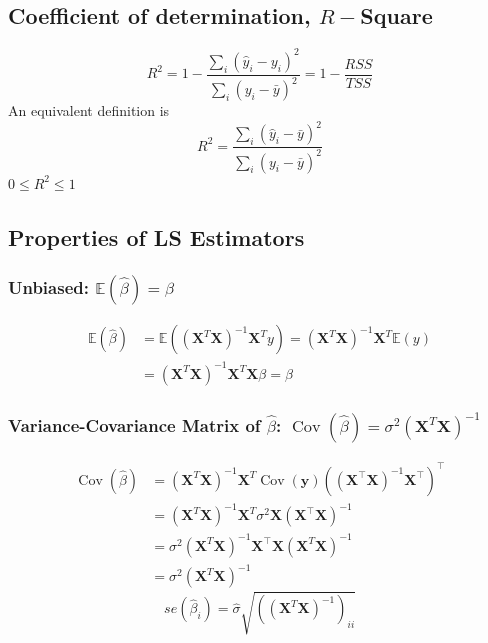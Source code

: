 \documentclass[11pt,a4paper]{article}
\begin{document}
\subsection{Coeﬃcient of determination, $R-$Square}
$$
R^{2}=1-\frac{\sum_{i}\left(\hat{y}_{i}-y_{i}\right)^{2}}{\sum_{i}\left(y_{i}-\bar{y}\right)^{2}}=1-\frac{R S S}{T S S}
$$
An equivalent definition is
$$
R^{2}=\frac{\sum_{i}\left(\hat{y}_{i}-\bar{y}\right)^{2}}{\sum_{i}\left(y_{i}-\bar{y}\right)^{2}}
$$
$0 \leq R^{2} \leq 1$

\subsection{Properties of LS Estimators}
\subsubsection{Unbiased: $\mathbb{E}(\hat{\beta})=\beta$}
\begin{equation}
    \begin{aligned}
        \mathbb{E}(\hat{\beta})&=\mathbb{E}(\left(\mathbf{X}^{T} \mathbf{X}\right)^{-1} \mathbf{X}^{T} y)=\left(\mathbf{X}^{T} \mathbf{X}\right)^{-1} \mathbf{X}^{T} \mathbb{E}(y)\\
        &=\left(\mathbf{X}^{T} \mathbf{X}\right)^{-1} \mathbf{X}^{T}\mathbf{X}\beta=\beta
    \end{aligned}
    \nonumber
\end{equation}

\subsubsection{Variance-Covariance Matrix of $\hat{\beta}$: $\operatorname{Cov}(\hat{\beta})=\sigma^{2}\left(\mathbf{X}^{T} \mathbf{X}\right)^{-1}$}
$$\begin{aligned} \operatorname{Cov}(\hat{\beta}) &=\left(\mathbf{X}^{T} \mathbf{X}\right)^{-1} \mathbf{X}^{T} \operatorname{Cov}(\mathbf{y})\left(\left(\mathbf{X}^{\top} \mathbf{X}\right)^{-1} \mathbf{X}^{\top}\right)^{\top} \\ &=\left(\mathbf{X}^{T} \mathbf{X}\right)^{-1} \mathbf{X}^{T} \sigma^{2} \mathbf{X}\left(\mathbf{X}^{\top} \mathbf{X}\right)^{-1} \\ &=\sigma^{2}\left(\mathbf{X}^{T} \mathbf{X}\right)^{-1} \mathbf{X}^{\top} \mathbf{X}\left(\mathbf{X}^{T} \mathbf{X}\right)^{-1} \\ &=\sigma^{2}\left(\mathbf{X}^{T} \mathbf{X}\right)^{-1} \end{aligned}$$
$$se(\hat{\beta}_i)=\hat{\sigma}\sqrt{((\mathbf{X}^T\mathbf{X})^{-1})_{ii}}$$
\end{document}
